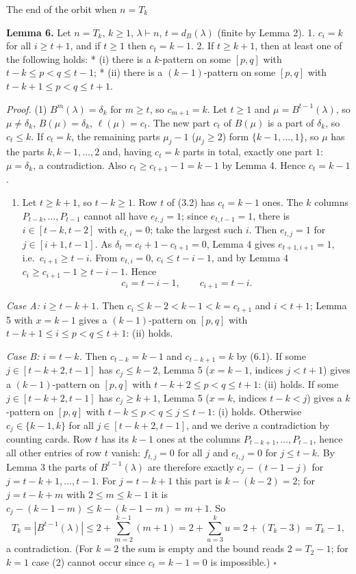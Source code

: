 \documentclass[11pt,a4paper]{article}
\providecommand{\tightlist}{\setlength{\itemsep}{0pt}\setlength{\parskip}{0pt}}
\begin{document}
The end of the orbit when \(n=T_k\)

\textbf{Lemma 6.} Let \(n=T_k\), \(k\ge1\), \(\lambda\vdash n\),
\(t=d_B(\lambda)\) (finite by Lemma 2). 1. \(c_i=k\) for all
\(i\ge t+1\), and if \(t\ge1\) then \(c_t=k-1\). 2. If \(t\ge k+1\),
then at least one of the following holds: * (i) there is a \(k\)-pattern
on some \([p,q]\) with \(t-k\le p<q\le t-1\); * (ii) there is a
\((k-1)\)-pattern on some \([p,q]\) with \(t-k+1\le p<q\le t+1\).

\emph{Proof.} (1) \(B^m(\lambda)=\delta_k\) for \(m\ge t\), so
\(c_{m+1}=k\). Let \(t\ge1\) and \(\mu=B^{t-1}(\lambda)\), so
\(\mu\ne\delta_k\), \(B(\mu)=\delta_k\), \(\ell(\mu)=c_t\). The new part
\(c_t\) of \(B(\mu)\) is a part of \(\delta_k\), so \(c_t\le k\). If
\(c_t=k\), the remaining parts \(\mu_j-1\) (\(\mu_j\ge2\)) form
\(\{k-1,\dots,1\}\), so \(\mu\) has the parts \(k,k-1,\dots,2\) and,
having \(c_t=k\) parts in total, exactly one part \(1\):
\(\mu=\delta_k\), a contradiction. Also \(c_t\ge c_{t+1}-1=k-1\) by
Lemma 4. Hence \(c_t=k-1\).

\begin{enumerate}
\def\labelenumi{(\arabic{enumi})}
\setcounter{enumi}{1}
\tightlist
\item
  Let \(t\ge k+1\), so \(t-k\ge1\). Row \(t\) of (3.2) has \(c_t=k-1\)
  ones. The \(k\) columns \(P_{t-k},\dots,P_{t-1}\) cannot all have
  \(e_{t,j}=1\); since \(e_{t,t-1}=1\), there is \(i\in[t-k,t-2]\) with
  \(e_{t,i}=0\); take the largest such \(i\). Then \(e_{t,j}=1\) for
  \(j\in[i+1,t-1]\). As \(\delta_t=c_t+1-c_{t+1}=0\), Lemma 4 gives
  \(e_{t+1,i+1}=1\), i.e.~\(c_{i+1}\ge t-i\). From \(e_{t,i}=0\),
  \(c_i\le t-i-1\), and by Lemma 4 \(c_i\ge c_{i+1}-1\ge t-i-1\). Hence
  \[c_i=t-i-1,\qquad c_{i+1}=t-i.\tag{6.1}\]
\end{enumerate}

\emph{Case A: \(i\ge t-k+1\).} Then \(c_i\le k-2<k-1<k=c_{t+1}\) and
\(i<t+1\); Lemma 5 with \(x=k-1\) gives a \((k-1)\)-pattern on \([p,q]\)
with \(t-k+1\le i\le p<q\le t+1\): (ii) holds.

\emph{Case B: \(i=t-k\).} Then \(c_{t-k}=k-1\) and \(c_{t-k+1}=k\) by
(6.1). If some \(j\in[t-k+2,t-1]\) has \(c_j\le k-2\), Lemma 5
(\(x=k-1\), indices \(j<t+1\)) gives a \((k-1)\)-pattern on \([p,q]\)
with \(t-k+2\le p<q\le t+1\): (ii) holds. If some \(j\in[t-k+2,t-1]\)
has \(c_j\ge k+1\), Lemma 5 (\(x=k\), indices \(t-k<j\)) gives a
\(k\)-pattern on \([p,q]\) with \(t-k\le p<q\le j\le t-1\): (i) holds.
Otherwise \(c_j\in\{k-1,k\}\) for all \(j\in[t-k+2,t-1]\), and we derive
a contradiction by counting cards. Row \(t\) has its \(k-1\) ones at the
columns \(P_{t-k+1},\dots,P_{t-1}\), hence all other entries of row
\(t\) vanish: \(f_{t,j}=0\) for all \(j\) and \(e_{t,j}=0\) for
\(j\le t-k\). By Lemma 3 the parts of \(B^{t-1}(\lambda)\) are therefore
exactly \(c_j-(t-1-j)\) for \(j=t-k+1,\dots,t-1\). For \(j=t-k+1\) this
part is \(k-(k-2)=2\); for \(j=t-k+m\) with \(2\le m\le k-1\) it is
\(c_j-(k-1-m)\le k-(k-1-m)=m+1\). So
\[T_k=|B^{t-1}(\lambda)|\le 2+\sum_{m=2}^{k-1}(m+1)=2+\sum_{u=3}^{k}u=2+(T_k-3)=T_k-1,\]
a contradiction. (For \(k=2\) the sum is empty and the bound reads
\(2=T_2-1\); for \(k=1\) case (2) cannot occur since \(c_t=k-1=0\) is
impossible.) \(\square\)
\end{document}
